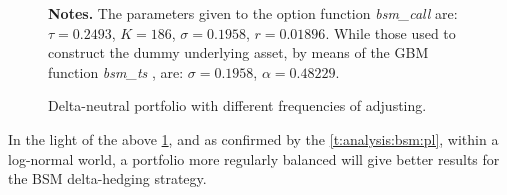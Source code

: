 \documentclass[12pt,a4paper]{report}
\begin{document}
\begin{figure}[h]
  \centering
  
  \caption{Delta-neutral portfolio with different frequencies of adjusting.}
  \begin{changemargin}{0.5cm}{0.5cm}
  \medskip
\footnotesize
{}\textbf{Notes.} The parameters given to the option function \textit{bsm\_call} are: $\tau = 0.2493$, $K = 186$, $\sigma = 0.1958$, $r = 0.01896$. While those used to construct the dummy underlying asset, by means of the GBM function \textit{bsm\_ts} , are: $\sigma = 0.1958$, $\alpha = 0.48229$.
  \end{changemargin}
  \label{p:analysis:gbm:hedges}
\end{figure}

In the light of the above \cref{p:analysis:gbm:hedges}, and as confirmed by the \cref{t:analysis:bsm:pl}, within a log-normal world, a portfolio more regularly balanced will give better results for the BSM delta-hedging strategy.
    
\end{document}

